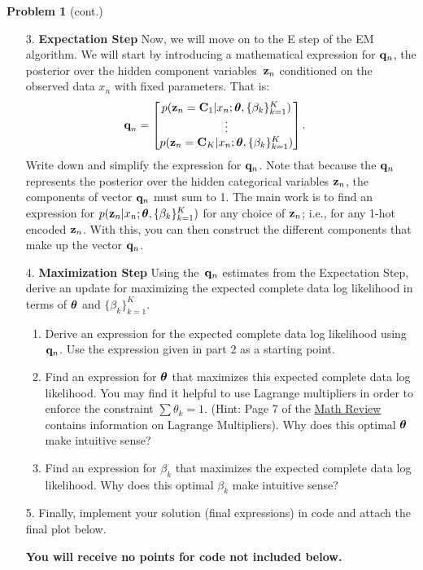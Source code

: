 \documentclass[submit]{harvardml}
\begin{document}
\begin{framed}
\noindent\textbf{Problem 1} (cont.)\\
\begin{enumerate}
\item[3.] \textbf{Expectation Step} Now, we will move on to the E step of the EM algorithm. We will start by introducing a
  mathematical expression for $\mathbf{q}_n$, the posterior over the
  hidden component variables~$\mathbf{z}_n$ conditioned on the observed data
  $x_n$ with fixed parameters.
That is:
  \begin{align*}
    \textbf{q}_n &= \begin{bmatrix}
      p(\mathbf{z}_n =\mathbf{C}_1| x_n; \boldsymbol{\theta}, \{ \beta_k \}^K_{k=1}) \\
      \vdots \\
      p(\mathbf{z}_n =\mathbf{C}_K| x_n; \boldsymbol{\theta}, \{ \beta_k \}^K_{k=1})
    \end{bmatrix}.
  \end{align*}
%
  Write down and simplify the expression for
  $\mathbf{q}_n$.  Note that because the $\mathbf{q}_n$ represents the
  posterior over the hidden categorical variables $\mathbf{z}_n$, the
  components of vector $\mathbf{q}_n$ must sum to 1.
  The main work is to find an expression for $p(\mathbf{z}_n|x_n; \boldsymbol{\theta}, \{\beta_k\}^K_{k=1})$  for any choice of $\mathbf{z}_n$; i.e., for any 1-hot encoded $\mathbf{z}_n$. With this, you can then construct the different components that make up the vector $\mathbf{q}_n$.
  
\item[4.] \textbf{Maximization Step}
Using the~$\mathbf{q}_n$ estimates from the Expectation Step, derive an update for maximizing the expected complete data log likelihood in terms of $\boldsymbol{\theta}$ and $\{ \beta_k \}^K_{k=1}$.

\begin{enumerate}
    \item Derive an expression for the expected complete data log likelihood using $\mathbf{q}_n$. Use the expression given in part 2 as a starting point.
    \item Find an expression for $\boldsymbol{\theta}$ that maximizes this expected complete data log likelihood. You may find it helpful to use Lagrange multipliers in order to enforce the constraint $\sum \theta_k = 1$. (Hint: Page 7 of the \href{https://harvard-ml-courses.github.io/cs181-web/sections/sec00-mathreview/sec0_semicondensed.pdf}{Math Review} contains information on Lagrange Multipliers). Why does this optimal $\boldsymbol{\theta}$ make intuitive sense?
    \item Find an expression for $\beta_k$ that maximizes the expected complete data log likelihood.  Why does this optimal $\beta_k$  make intuitive sense?
\end{enumerate}
  

\item[5.] Finally, implement your solution (final expressions) in code and attach the final plot below.

{\bfseries You will receive no points for code not included below.}
\end{enumerate}
  
\end{framed}
\end{document}

